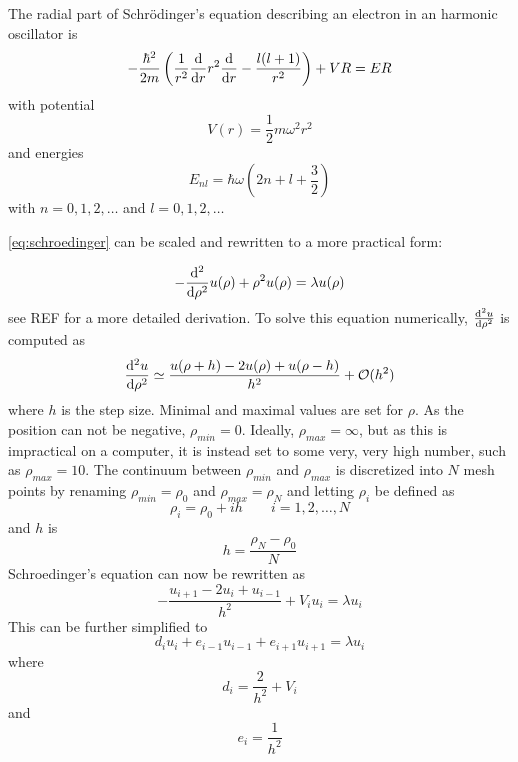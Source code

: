 \documentclass[aps,reprint]{revtex4-1}
\begin{document}
The radial part of Schrödinger's
equation describing an electron in an harmonic oscillator is
\begin{equation}
  \label{eq:schroedinger}
  -\frac{\hbar^{2}}{2m} \left( \frac{1}{r^{2}}\dv{r}r^{2}\dv{r} - \frac{l(l+1)}{r^{2}} \right) + VR = ER
\end{equation}
with potential
\begin{equation*}
  V(r) = \frac{1}{2}mω^{2}r^{2}
\end{equation*}
and energies
\begin{equation*}
  E_{nl} = \hbar\omega\left( 2n+l+\frac{3}{2} \right)
\end{equation*}
with \(n=0,1,2,\ldots\) and \(l = 0,1,2,\ldots\)

\eqref{eq:schroedinger} can be scaled and rewritten to a more practical form:

\begin{equation}
  \label{eq:scaledschroedinger}
  -\dv[2]{\rho}u(\rho)+\rho^{2}u(\rho) = \lambda u(\rho)
\end{equation}
see REF for a more detailed derivation. To solve this equation numerically,
\(\dv[2]{u}{\rho}\) is computed as
\begin{equation*}
  \dv[2]{u}{\rho} \simeq \frac{u(\rho+h)-2u(\rho)+u(\rho-h)}{h^{2}} + \mathcal{O}(h^{2})
\end{equation*}
where \(h\) is the step size. Minimal and maximal values are set for \(\rho\).
As the position can not be negative, \(\rho_{min}=0\). Ideally,
\(\rho_{max}=\infty\), but as this is impractical on a computer, it is instead
set to some very, very high number, such as \(\rho_{max}=10\). The continuum between
\(\rho_{min}\) and \(\rho_{max}\) is discretized into \(N\) mesh points by
renaming \(\rho_{min}=\rho_{0}\) and \(\rho_{max}=\rho_{N}\) and letting
\(\rho_{i}\) be defined as
\begin{equation*}
  \rho_{i} = \rho_{0}+ih\qquad i=1,2,\ldots,N
\end{equation*}
and \(h\) is
\begin{equation*}
  h = \frac{\rho_{N}-\rho_{0}}{N}
\end{equation*}
Schroedinger's equation can now be rewritten as
\begin{equation*}
  - \frac{u_{i+1}-2u_{i}+u_{i-1}}{h^{2}} + V_{i}u_{i} = \lambda u_{i}
\end{equation*}
This can be further simplified to
\begin{equation*}
  d_{i}u_{i}+e_{i-1}u_{i-1}+e_{i+1}u_{i+1} = \lambda u_{i}
\end{equation*}
where
\begin{equation*}
  d_{i} = \frac{2}{h^{2}} + V_{i}
\end{equation*}
and
\begin{equation*}
  e_{i}= \frac{1}{h^{2}}
\end{equation*}
\end{document}
